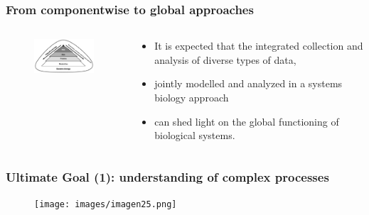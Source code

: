 \documentclass{beamer}
\begin{document}
  
  
  \begin{frame}
  	\frametitle{From componentwise to global approaches}
  	\begin{columns}%
  		
  		\begin{column}[t]{0.45\textwidth}%
  			\begin{figure}[ht]
  				\centering
  				\includegraphics[width=50mm]{images/Imagen24.png}
  			\end{figure} 
  		\end{column}
  		
  		\begin{column}[t]{0.45\textwidth}%
  			\begin{itemize}
  				\item It is expected that the integrated collection and analysis of diverse types of data,
  				\item jointly modelled and analyzed in a systems biology approach 
  				\item can shed light on the global functioning of biological systems.
  			\end{itemize}
  		\end{column}
  		
  	\end{columns}
  \end{frame} 
  

\begin{frame}
  	\frametitle{Ultimate Goal (1): understanding of complex processes
  		}
  		\begin{figure}[ht]
  			\centering
  			\texttt{[image: images/imagen25.png]}
  		\end{figure} 
\end{frame}
  
\end{document}
